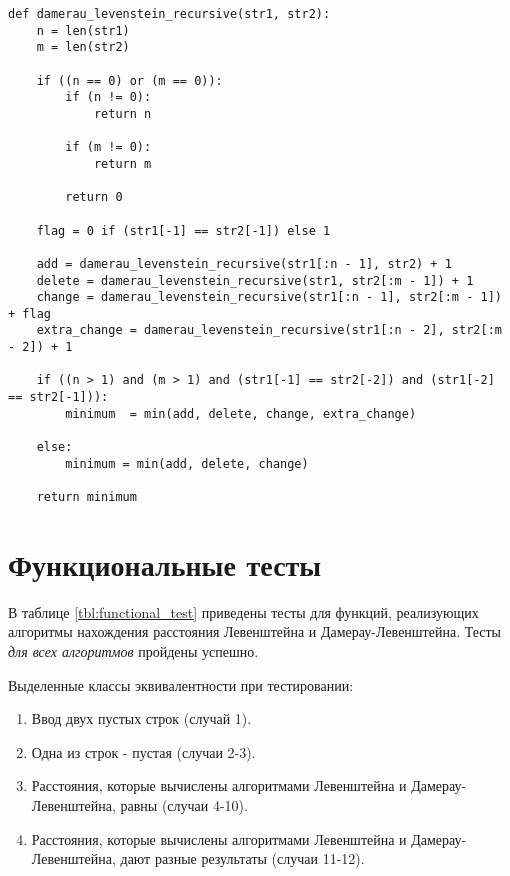\begin{center}
    \captionsetup{justification=raggedright,singlelinecheck=off}
    \begin{lstlisting}[label=lst:dam_lev_rec,caption=Алгоритм нахождения расстояния Дамерау-Левенштейна (реккурсивный)]
def damerau_levenstein_recursive(str1, str2):
    n = len(str1)
    m = len(str2)

    if ((n == 0) or (m == 0)):
        if (n != 0):
            return n
        
        if (m != 0):
            return m

        return 0

    flag = 0 if (str1[-1] == str2[-1]) else 1

    add = damerau_levenstein_recursive(str1[:n - 1], str2) + 1
    delete = damerau_levenstein_recursive(str1, str2[:m - 1]) + 1
    change = damerau_levenstein_recursive(str1[:n - 1], str2[:m - 1]) + flag
    extra_change = damerau_levenstein_recursive(str1[:n - 2], str2[:m - 2]) + 1

    if ((n > 1) and (m > 1) and (str1[-1] == str2[-2]) and (str1[-2] == str2[-1])):
        minimum  = min(add, delete, change, extra_change)

    else:
        minimum = min(add, delete, change)

    return minimum
\end{lstlisting}
\end{center}

\section{Функциональные тесты}

В таблице \ref{tbl:functional_test} приведены тесты для функций, реализующих алгоритмы нахождения расстояния Левенштейна и Дамерау-Левенштейна. Тесты \textit{для всех алгоритмов} пройдены успешно.

Выделенные классы эквивалентности при тестировании:
\begin{enumerate}
    \item Ввод двух пустых строк (случай 1).
    \item Одна из строк - пустая (случаи 2-3).
    \item Расстояния, которые вычислены алгоритмами Левенштейна и Дамерау-Левенштейна, равны (случаи 4-10).
    \item Расстояния, которые вычислены алгоритмами Левенштейна и Дамерау-Левенштейна, дают разные результаты (случаи 11-12).
\end{enumerate}



